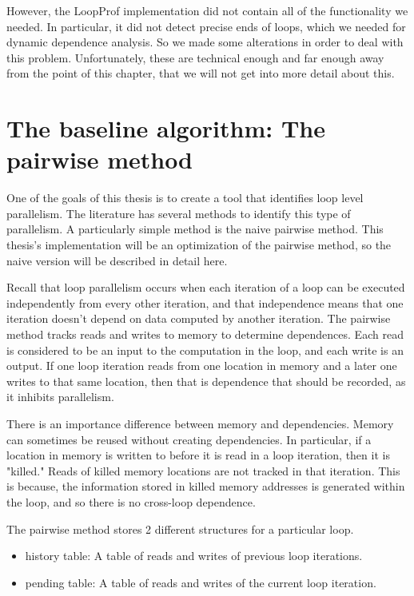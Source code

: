 \documentclass[12pt,twoside]{reedthesis}
\begin{document}
		However, the LoopProf implementation did not contain all of the functionality we needed. In particular, it did not detect precise ends of loops, which we needed for dynamic dependence analysis. So we made some alterations in order to deal with this problem. Unfortunately, these are technical enough and far enough away from the point of this chapter, that we will not get into more detail about this. 
		
	\section{The baseline algorithm: The pairwise method}
	
		One of the goals of this thesis is to create a tool that identifies loop level parallelism. The literature has several methods to identify this type of parallelism. A particularly simple method is the naive pairwise method. This thesis's implementation will be an optimization of the pairwise method, so the naive version will be described in detail here. 
		
		Recall that loop parallelism occurs when each iteration of a loop can be executed independently from every other iteration, and that independence means that one iteration doesn't depend on data computed by another iteration. 
		The pairwise method tracks reads and writes to memory to determine dependences. Each read is considered to be an input to the computation in the loop, and each write is an output. If one loop iteration reads from one location in memory and a later one writes to that same location, then that is dependence that should be recorded, as it inhibits parallelism. 
		
		There is an importance difference between memory and dependencies. Memory can sometimes be reused without creating dependencies. In particular, if a location in memory is written to before it is read in a loop iteration, then it is "killed." Reads of killed memory locations are not tracked in that iteration. This is because, the information stored in killed memory addresses is generated within the loop, and so there is no cross-loop dependence. 
		
		The pairwise method stores 2 different structures for a particular loop. 
		
		\begin{itemize}
			\item history table: A table of reads and writes of previous loop iterations.
			\item pending table: A table of reads and writes of the current loop iteration.
		\end{itemize}
	
\end{document}
